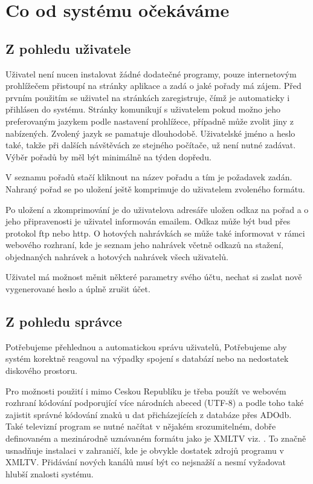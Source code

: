 \chapter{Co od systému očekáváme}

\section{Z pohledu uživatele}
Uživatel není nucen instalovat žádné dodatečné programy, pouze internetovým prohlížečem přistoupí na stránky aplikace a zadá o jaké pořady má zájem. Před prvním použitím se uživatel na stránkách zaregistruje, čímž je automaticky i přihlásen do systému. Stránky komunikují s uživatelem pokud možno jeho preferovaným jazykem podle nastavení prohlížece, případně může zvolit jiny z nabízených. Zvolený jazyk se pamatuje dlouhodobě. Uživatelské jméno a heslo také, takže při dalších návštěvách ze stejného počítače, už není nutné zadávat. Výběr pořadů by měl být minimálně na týden dopředu.

\vspace{10pt}

V seznamu pořadů stačí kliknout na název pořadu a tím je požadavek zadán. Nahraný pořad se po uložení ještě komprimuje do uživatelem zvoleného formátu.

\vspace{10pt}

Po uložení a zkomprimování je do uživatelova adresáře uložen odkaz na pořad a o jeho připravenosti je uživatel informován emailem. Odkaz může být bud přes protokol ftp nebo http. O hotových nahrávkách se může také informovat v rámci webového rozhraní, kde je seznam jeho nahrávek včetně odkazů na stažení, objednaných nahrávek a hotových nahrávek všech uživatelů.

\vspace{10pt}

Uživatel má možnost měnit některé parametry svého účtu, nechat si zaslat nově vygenerované heslo a úplně zrušit účet.

\vspace{10pt}

\section{Z pohledu správce}
Potřebujeme přehlednou a automatickou správu uživatelů, Potřebujeme aby systém korektně reagoval na výpadky spojení s databází nebo na nedostatek diskového prostoru.

Pro možnosti použití i mimo Ceskou Republiku je třeba použít ve webovém rozhraní kódování podporující více národních abeced (UTF-8) a podle toho také zajistit správné kódování znaků u dat přicházejících z databáze přes ADOdb. Také televizní program se nutné načítat v nějakém srozumitelném, dobře definovaném a mezinárodně uznávaném formátu jako je XMLTV viz. \cite{xmltvURL}. To značně usnadňuje instalaci v zahraničí, kde je obvykle dostatek zdrojů programu v XMLTV. Přidávání nových kanálů musí být co nejsnažší a nesmí vyžadovat hlubší znalosti systému.

\vspace{10pt}
